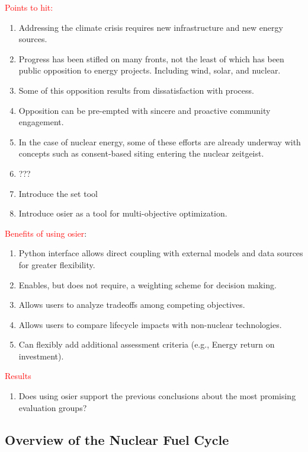 \textcolor{red}{Points to hit:}
\begin{enumerate}
    \item Addressing the climate crisis requires new infrastructure and new energy sources.
    \item Progress has been stifled on many fronts, not the least of which has been public opposition to energy projects. Including wind, solar, and nuclear.
    \item Some of this opposition results from dissatisfaction with process.
    \item Opposition can be pre-empted with sincere and proactive community engagement.
    \item In the case of nuclear energy, some of these efforts are already underway with concepts such as consent-based siting entering the nuclear zeitgeist.
    \item ???
    \item Introduce the \ac{set} tool
    \item  Introduce \ac{osier} as a tool for multi-objective optimization.
\end{enumerate}

\textcolor{red}{Benefits of using \ac{osier}}:
\begin{enumerate}
    \item Python interface allows direct coupling with external models and data sources for greater flexibility.
    \item Enables, but does not require, a weighting scheme for decision making.
    \item Allows users to analyze tradeoffs among competing objectives.
    \item Allows users to compare lifecycle impacts with non-nuclear technologies.
    \item Can flexibly add additional assessment criteria (e.g., Energy return on investment). 
\end{enumerate}

\textcolor{red}{Results}
\begin{enumerate}
    \item Does using \ac{osier} support the previous conclusions about the most promising evaluation groups?
\end{enumerate}

\subsection{Overview of the Nuclear Fuel Cycle}

